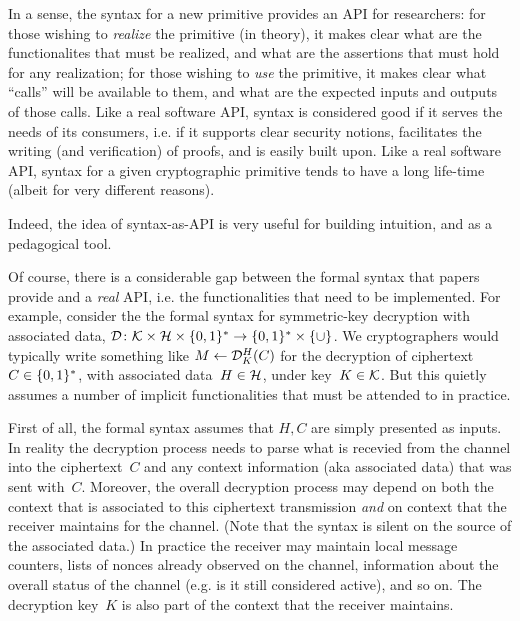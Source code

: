 In a sense, the syntax for a new primitive provides an API for researchers: for
those wishing to \emph{realize} the primitive (in theory), it makes clear what
are the functionalites that must be realized, and what are the assertions that
must hold for any realization; for those wishing to \emph{use} the primitive, it
makes clear what ``calls'' will be available to them, and what are the expected
inputs and outputs of those calls.
%
Like a real software API, syntax is considered good if it serves the needs of
its consumers, i.e. if it supports clear security notions, facilitates the
writing (and verification) of proofs, and is easily built upon.
%
Like a real software API, syntax for a given cryptographic primitive tends to
have a long life-time (albeit for very different reasons).
%
Indeed, the idea of syntax-as-API is very useful for building intuition, and as
a pedagogical tool.


Of course, there is a considerable gap between the formal syntax that
papers provide and a \emph{real} API, i.e. the functionalities that
need to be implemented.  For example, consider the
the formal syntax for symmetric-key decryption with associated data, $\mathcal{D}\colon\mathcal{K}
\times \mathcal{H} \times \{0,1\}^* \to \{0,1\}^* \times \{\cup\}$.  We
cryptographers would typically write something like $M \gets
\mathcal{D}^H_K(C)$ for the decryption of ciphertext~$C\in\{0,1\}^*$, with associated
data~$H \in \mathcal{H}$, under key~$K \in \mathcal{K}$.  
But this quietly assumes a number of implicit functionalities that
must be attended to in practice.  

First of all, the formal syntax assumes that $H,C$ are simply
presented as inputs.  In reality the decryption process needs to parse what is recevied from the
channel into the ciphertext~$C$ and any context information (aka
associated data) that was sent with~$C$.  Moreover, the overall
decryption process may depend on both the context that is associated
to this ciphertext transmission \emph{and} on context that the
receiver maintains for the channel.  (Note that the syntax is silent
on the source of the associated data.)  In practice the receiver may
maintain local message counters, lists of nonces already observed on
the channel, information about the overall status of the channel
(e.g. is it still considered active), and so on.  The decryption
key~$K$ is also part of the context that the receiver maintains.

